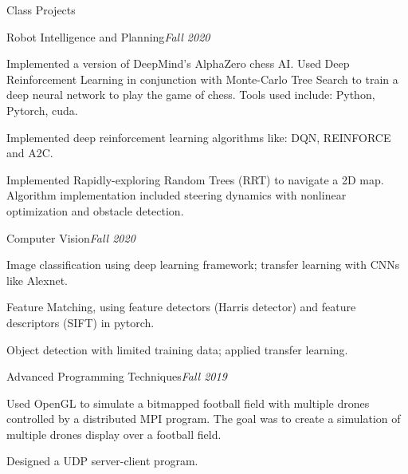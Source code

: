 \documentclass{resume} %
\begin{document}
\begin{rSection}{Class Projects}
\begin{rSubsection}{Robot Intelligence and Planning}{\em Fall 2020}{}{}
\item Implemented a version of DeepMind's AlphaZero chess AI. Used Deep Reinforcement Learning in conjunction with Monte-Carlo Tree Search to train a deep neural network to play the game of chess. Tools used include: Python, Pytorch, cuda.

\item Implemented deep reinforcement learning algorithms like: DQN, REINFORCE and A2C.

\item Implemented Rapidly-exploring Random Trees (RRT) to navigate a 2D map. Algorithm implementation included steering dynamics with nonlinear optimization and obstacle detection.

\end{rSubsection}
\begin{rSubsection}{Computer Vision}{\em Fall 2020}{}{}
\item Image classification using deep learning framework; transfer learning with CNNs like Alexnet.
\item Feature Matching, using feature detectors (Harris detector) and feature descriptors (SIFT) in pytorch.
\item Object detection with limited training data; applied transfer learning.
\end{rSubsection}
\begin{rSubsection}{Advanced Programming Techniques}{\em Fall 2019}{}{}
\item Used OpenGL to simulate a bitmapped football field with multiple drones controlled by a distributed MPI program. The goal was to create a simulation of multiple drones display over a football field. 
\item Designed a UDP server-client program.
\end{rSubsection}


\end{rSection}
\end{document}
